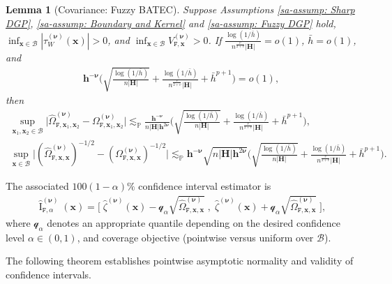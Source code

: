 \documentclass[10pt]{article}
\newtheorem{lem}{Lemma}
\DeclareMathOperator{\CI}{I}
\newcommand{\lessp}{\lesssim_{\mathbb{P}}}
\newcommand{\bh}{\mathbf{h}}
\newcommand{\bH}{\mathbf{H}}
\newcommand{\bx}{\mathbf{x}}
\newcommand{\bnu}{\boldsymbol{\nu}}
\newcommand{\B}{\mathcal{B}}
\newcommand{\q}{\mathcal{q}}
\newcommand{\ttF}{\mathtt{F}}
\begin{document}
\begin{lem}[Covariance: Fuzzy BATEC]\label{sa-lem: Covariance: Fuzzy BATEC}
    Suppose Assumptions \ref{sa-assump: Sharp DGP}, \ref{sa-assump: Boundary and Kernel} and \ref{sa-assump: Fuzzy DGP} hold, $\inf_{\bx\in\B}|\tau_W^{(\bnu)}(\bx)|>0$, and $\inf_{\bx\in\B}V_{\mathtt{F},\bx}^{(\bnu)}>0$. If $\frac{\log(1/\bar{h})}{n^{\frac{v}{2+v}} |\bH|} = o(1)$, $\bar{h}=o(1)$, and
    \begin{align*}
        \bh^{-\bnu}\bigg(\sqrt{\frac{\log(1/\bar{h})}{n |\bH|}}+\frac{\log(1/\bar{h})}{n^{\frac{v}{2+v}}|\bH|}+\bar{h}^{p+1}\bigg)=o(1),
    \end{align*}
    then
    \begin{gather*}
        \sup_{\bx_1,\bx_2 \in \B} \big|\widehat{\Omega}_{\ttF, \bx_1,\bx_2}^{(\bnu)} - \Omega_{\ttF, \bx_1,\bx_2}^{(\bnu)}\big|
        \lessp \frac{\bh^{-\bnu}}{n |\bH|\bh^{2\bnu}}\bigg(\sqrt{\frac{\log(1/\bar{h})}{n |\bH|}} + \frac{\log(1/\bar{h})}{n^{\frac{v}{2+v}}|\bH|}+ \bar{h}^{p+1}\bigg), \\
        \sup_{\bx \in \B} \big|(\widehat{\Omega}_{\ttF, \bx,\bx}^{(\bnu)})^{-1/2} - (\Omega_{\ttF, \bx,\bx}^{(\bnu)})^{-1/2} \big|
        \lessp \bh^{-\bnu}\sqrt{n |\bH|\bh^{2\bnu}}\bigg(\sqrt{\frac{\log(1/\bar{h})}{n |\bH|}} + \frac{\log(1/\bar{h})}{n^{\frac{v}{2+v}}|\bH|} + \bar{h}^{p+1}\bigg).
    \end{gather*}
\end{lem}

The associated $100(1-\alpha)\%$ confidence interval estimator is
\begin{align*}
    \widehat{\CI}^{(\bnu)}_{\mathtt{F},\alpha}(\bx)
    = \bigg[\;\widehat{\zeta}^{(\bnu)}(\bx) - \q_{\alpha} \sqrt{\widehat{\Omega}_{\mathtt{F},\bx,\bx}^{(\bnu)}}
            \; , \;
              \widehat{\zeta}^{(\bnu)}(\bx) + \q_{\alpha} \sqrt{\widehat{\Omega}_{\mathtt{F},\bx,\bx}^{(\bnu)}}\;\bigg],
\end{align*}
where $\q_{\alpha}$ denotes an appropriate quantile depending on the desired confidence level $\alpha\in(0,1)$, and coverage objective (pointwise versus uniform over $\B$).

The following theorem establishes pointwise asymptotic normality and validity of confidence intervals.
\end{document}
